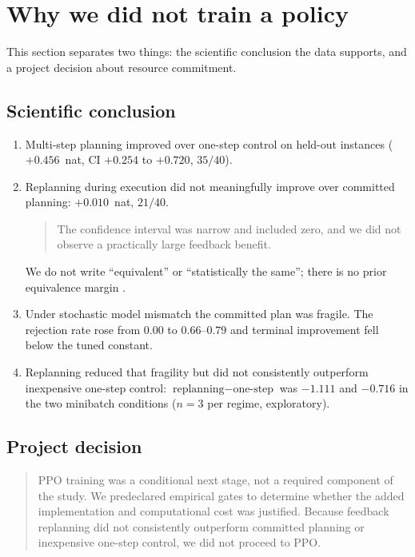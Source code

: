 \section{Why we did not train a policy}
\label{sec:nopolicy}

This section separates two things: the scientific conclusion the data supports, and
a project decision about resource commitment.

\subsection{Scientific conclusion}
\label{sec:scientific-conclusion}

\begin{enumerate}
  \item Multi-step planning improved over one-step control on held-out instances
        ($+0.456$~nat, CI $+0.254$ to $+0.720$, $35/40$).
  \item Replanning during execution did not meaningfully improve over committed
        planning: $+0.010$~nat, $21/40$.

        \begin{quote}
        The confidence interval was narrow and included zero, and we did not
        observe a practically large feedback benefit.
        \end{quote}

        We do not write ``equivalent'' or ``statistically the same''; there is no
        prior equivalence margin
        \citep{schuirmann1987tost,lakens2017equivalence}.
  \item Under stochastic model mismatch the committed plan was fragile. The
        rejection rate rose from $0.00$ to $0.66$--$0.79$ and terminal improvement
        fell below the tuned constant.
  \item Replanning reduced that fragility but did not consistently outperform
        inexpensive one-step control: $\text{replanning} - \text{one-step}$ was
        $-1.111$ and $-0.716$ in the two minibatch conditions
        ($n = 3$ per regime, exploratory).
\end{enumerate}

\subsection{Project decision}

\begin{quote}
PPO training was a conditional next stage, not a required component of the study. We
predeclared empirical gates to determine whether the added implementation and
computational cost was justified. Because feedback replanning did not consistently
outperform committed planning or inexpensive one-step control, we did not proceed to
PPO.
\end{quote}

